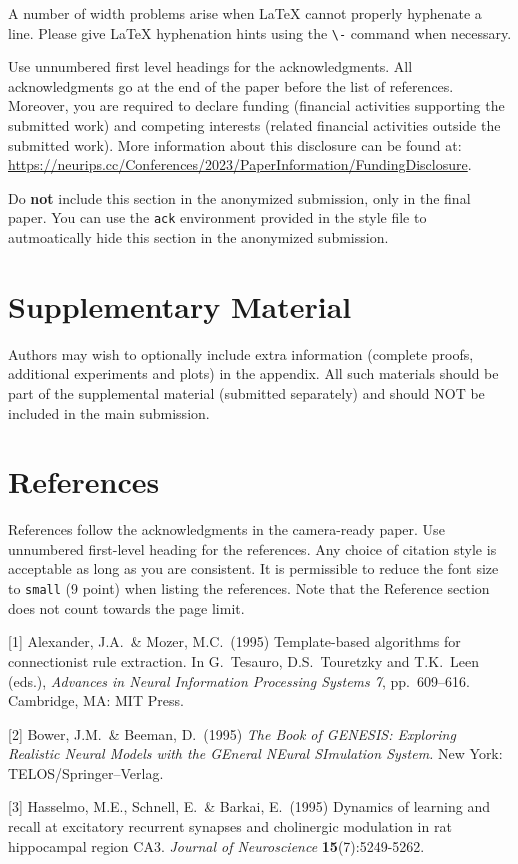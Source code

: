 \documentclass{article}
\begin{document}
	
	A number of width problems arise when \LaTeX{} cannot properly hyphenate a
	line. Please give LaTeX hyphenation hints using the \verb+\-+ command when
	necessary.
	
	
	\begin{ack}
		Use unnumbered first level headings for the acknowledgments. All acknowledgments
		go at the end of the paper before the list of references. Moreover, you are required to declare
		funding (financial activities supporting the submitted work) and competing interests (related financial activities outside the submitted work).
		More information about this disclosure can be found at: \url{https://neurips.cc/Conferences/2023/PaperInformation/FundingDisclosure}.
		
		
		Do {\bf not} include this section in the anonymized submission, only in the final paper. You can use the \texttt{ack} environment provided in the style file to autmoatically hide this section in the anonymized submission.
	\end{ack}
	
	
	
	\section{Supplementary Material}
	
	Authors may wish to optionally include extra information (complete proofs, additional experiments and plots) in the appendix. All such materials should be part of the supplemental material (submitted separately) and should NOT be included in the main submission.
	
	
	\section*{References}
	
	
	References follow the acknowledgments in the camera-ready paper. Use unnumbered first-level heading for
	the references. Any choice of citation style is acceptable as long as you are
	consistent. It is permissible to reduce the font size to \verb+small+ (9 point)
	when listing the references.
	Note that the Reference section does not count towards the page limit.
	\medskip
	
	
	{
		\small
		
		
		[1] Alexander, J.A.\ \& Mozer, M.C.\ (1995) Template-based algorithms for
		connectionist rule extraction. In G.\ Tesauro, D.S.\ Touretzky and T.K.\ Leen
		(eds.), {\it Advances in Neural Information Processing Systems 7},
		pp.\ 609--616. Cambridge, MA: MIT Press.
		
		
		[2] Bower, J.M.\ \& Beeman, D.\ (1995) {\it The Book of GENESIS: Exploring
			Realistic Neural Models with the GEneral NEural SImulation System.}  New York:
		TELOS/Springer--Verlag.
		
		
		[3] Hasselmo, M.E., Schnell, E.\ \& Barkai, E.\ (1995) Dynamics of learning and
		recall at excitatory recurrent synapses and cholinergic modulation in rat
		hippocampal region CA3. {\it Journal of Neuroscience} {\bf 15}(7):5249-5262.
	}
	
	
	
\end{document}
